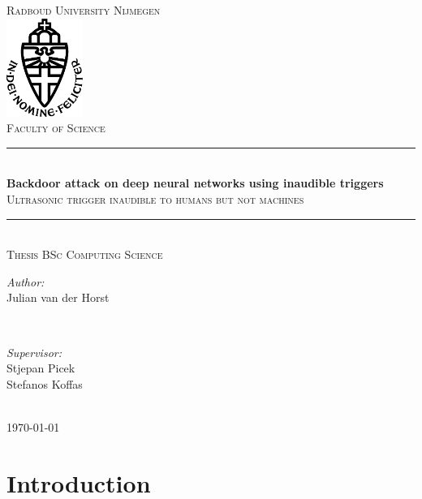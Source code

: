 \documentclass{report}
\title{\thesistitle}
\author{\thesisauthorfirst\space\thesisauthorsecond}
\date{\thesisdate}
\def\thesistitle{Backdoor attack on deep neural networks using inaudible triggers}
\def\thesissubtitle{Ultrasonic trigger inaudible to humans but not machines}
\def\thesisauthorfirst{Julian van der Horst}
\def\thesisauthorsecond{}
\def\thesissupervisorfirst{Stjepan Picek\\Stefanos Koffas}
\def\thesissupervisorsecond{}
\def\thesissecondreaderfirst{}
\def\thesissecondreadersecond{}
\def\thesisdate{December 2022}
\theoremstyle{definition}
\theoremstyle{remark}
\begin{document}
\begin{titlepage}
	\thispagestyle{empty}
	\newcommand{\HRule}{\rule{\linewidth}{0.5mm}}
	\center
	\textsc{\Large Radboud University Nijmegen}\\[.7cm]
	\includegraphics[width=25mm]{img/in_dei_nomine_feliciter.eps}\\[.5cm]
	\textsc{Faculty of Science}\\[0.5cm]
	
	\HRule \\[0.4cm]
	{ \huge \bfseries \thesistitle}\\[0.1cm]
	\textsc{\thesissubtitle}\\
	\HRule \\[.5cm]
	\textsc{\large Thesis BSc Computing Science}\\[.5cm]
	
	\begin{minipage}{0.4\textwidth}
	\begin{flushleft} \large
	\emph{Author:}\\
	\thesisauthorfirst\space \textsc{\thesisauthorsecond}
	\end{flushleft}
	\end{minipage}
	~
	\begin{minipage}{0.4\textwidth}
	\begin{flushright} \large
	\emph{Supervisor:} \\
	\thesissupervisorfirst\space \textsc{\thesissupervisorsecond} \\[1em]
	\end{flushright}
	\end{minipage}\\[4cm]
	\vfill
	{\large \today}\\
	\clearpage
\end{titlepage}

\tableofcontents

\chapter{Introduction}
\end{document}
